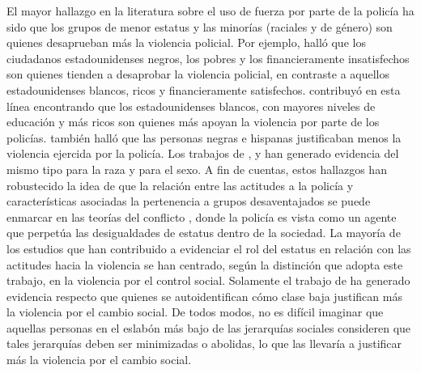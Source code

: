 \documentclass[12pt,twoside]{templates/facsothesis}
\begin{document}
El mayor hallazgo en la literatura sobre el uso de fuerza por parte de la policía ha sido que los grupos de menor estatus y las minorías (raciales y de género) son quienes desaprueban más la violencia policial. Por ejemplo, \citet{Gamson1970} halló que los ciudadanos estadounidenses negros, los pobres y los financieramente insatisfechos son quienes tienden a desaprobar la violencia policial, en contraste a aquellos estadounidenses blancos, ricos y financieramente satisfechos. \citet{Arthur1994} contribuyó en esta línea encontrando que los estadounidenses blancos, con mayores niveles de educación y más ricos son quienes más apoyan la violencia por parte de los policías. \citet{Weitzer2002} también halló que las personas negras e hispanas justificaban menos la violencia ejercida por la policía. Los trabajos de \citet{Blumenthal1972}, \citet{Thompson2004} y \citet{Johnson2009} han generado evidencia del mismo tipo para la raza y para el sexo. A fin de cuentas, estos hallazgos han robustecido la idea de que la relación entre las actitudes a la policía y características asociadas la pertenencia a grupos desaventajados se puede enmarcar en las teorías del conflicto \citep{Chambliss1995, Quinney1971, Turk1969}, donde la policía es vista como un agente que perpetúa las desigualdades de estatus dentro de la sociedad. La mayoría de los estudios que han contribuido a evidenciar el rol del estatus en relación con las actitudes hacia la violencia se han centrado, según la distinción que adopta este trabajo, en la violencia por el control social. Solamente el trabajo de \citet{Gerber2017b} ha generado evidencia respecto que quienes se autoidentifican cómo clase baja justifican más la violencia por el cambio social. De todos modos, no es difícil imaginar que aquellas personas en el eslabón más bajo de las jerarquías sociales consideren que tales jerarquías deben ser minimizadas o abolidas, lo que las llevaría a justificar más la violencia por el cambio social.
\end{document}
